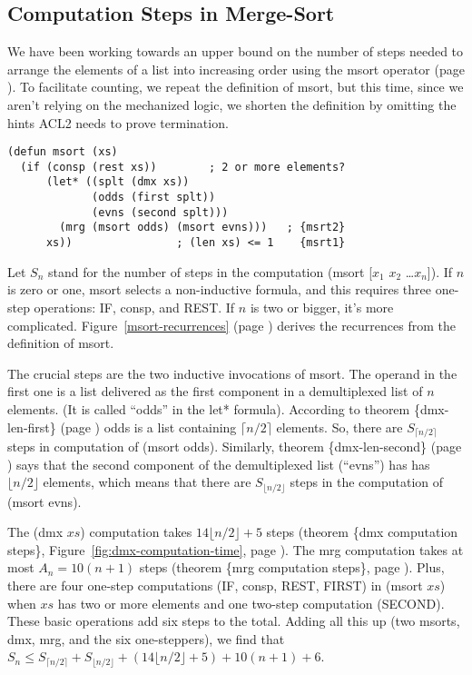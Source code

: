 \subsection{Computation Steps in Merge-Sort}
\label{subsec:msort-steps}

We have been working towards an upper bound on the number of steps
needed to arrange the elements of a list into increasing order
using the msort operator (page \pageref{defun:msort}).
To facilitate counting, we repeat the definition of msort,
but this time, since we aren't relying on the mechanized logic,
we shorten the definition by omitting the hints
ACL2 needs to prove termination.

\label{defun:msort-copy}
\begin{Verbatim}
(defun msort (xs)
  (if (consp (rest xs))        ; 2 or more elements?
      (let* ((splt (dmx xs))
             (odds (first splt))
             (evns (second splt)))
        (mrg (msort odds) (msort evns)))   ; {msrt2}
      xs))                ; (len xs) <= 1    {msrt1}
\end{Verbatim}

Let $S_n$ stand for the number of steps in the computation
(msort [$x_1$ $x_2$ \dots $x_n$]).
If $n$ is zero or one, msort selects a non-inductive
formula, and this requires three one-step operations: IF, consp, and REST.
If $n$ is two or bigger, it's more complicated.
Figure~\ref{msort-recurrences} (page \pageref{msort-recurrences})
derives the recurrences from the definition of msort.

The crucial steps are the two inductive invocations of msort.
The operand in the first one is a list delivered as the first component in
a demultiplexed list of $n$ elements.
(It is called ``odds'' in the let* formula).
According to theorem \{dmx-len-first\} (page \pageref{thm:dmx-length-first-second})
odds is a list containing $\lceil  n/2\rceil$ elements.
So, there are $S_{\lceil n/2\rceil}$ steps in computation of (msort odds).
Similarly, theorem  \{dmx-len-second\} (page \pageref{thm:dmx-length-first-second})
says that the second component of the demultiplexed list (``evns'') has
has $\lfloor n/2\rfloor$ elements, which means that there are
$S_{\lfloor n/2\rfloor}$ steps in the computation of (msort evns).

The (dmx $xs$) computation takes $14\lfloor  n/2\rfloor + 5$ steps
(theorem \{dmx computation steps\},
Figure~\ref{fig:dmx-computation-time},
page \pageref{fig:dmx-computation-time}).
The mrg computation takes at most $A_n = 10(n+1)$ steps
(theorem \{mrg computation steps\}, page \pageref{thm:mrg-steps}).
Plus, there are four one-step computations (IF, consp, REST, FIRST)
in (msort $xs$) when $xs$ has two or more elements
and one two-step computation (SECOND).
These basic operations add six steps to the total.
Adding all this up (two msorts, dmx, mrg, and the six one-steppers),
we find that
$S_n \leq S_{\lceil  n/2\rceil} + S_{\lfloor  n/2\rfloor} +
          (14\lfloor n/2\rfloor + 5) + 10(n+1) + 6$.

